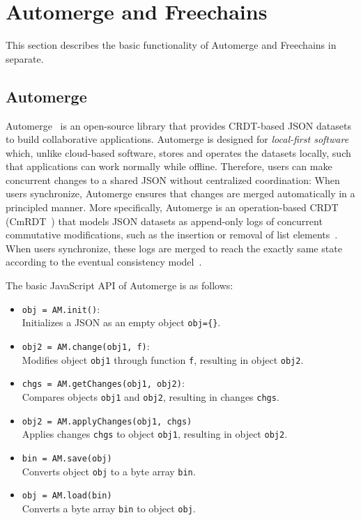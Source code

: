 \documentclass[12pt]{article}
\newcommand{\code}[1]  {\texttt{\footnotesize{#1}}}
\begin{document}
\section{Automerge and Freechains}
\label{sec.both}

This section describes the basic functionality of Automerge and Freechains in
separate.

\subsection{Automerge}

Automerge~\cite{kleppmann2018automerge} is an open-source library that provides
CRDT-based JSON datasets to build collaborative applications.
%
Automerge is designed for \emph{local-first software}~\cite{p2p.local} which,
unlike cloud-based software, stores and operates the datasets locally, such
that applications can work normally while offline.
%
Therefore, users can make concurrent changes to a shared JSON without
centralized coordination:
When users synchronize, Automerge ensures that changes are merged automatically
in a principled manner.
%
More specifically, Automerge is an operation-based CRDT
(CmRDT~\cite{p2p.crdts}) that models JSON datasets as append-only logs of
concurrent commutative modifications, such as the insertion or removal of list
elements~\cite{kleppmann2017conflict}.
%
When users synchronize, these logs are merged to reach the exactly same state
according to the eventual consistency model~\cite{p2p.sec}.

The basic JavaScript API of Automerge is as follows:

\begin{itemize}
\item \code{obj = AM.init()}: \\
    Initializes a JSON as an empty object \code{obj=\{\}}.
\item \code{obj2 = AM.change(obj1, f)}: \\
    Modifies object \code{obj1} through function \code{f}, resulting in
    object \code{obj2}.
\item \code{chgs = AM.getChanges(obj1, obj2)}: \\
    Compares objects \code{obj1} and \code{obj2}, resulting in changes
    \code{chgs}.
\item \code{obj2 = AM.applyChanges(obj1, chgs)} \\
    Applies changes \code{chgs} to object \code{obj1}, resulting in object
    \code{obj2}.
\item \code{bin = AM.save(obj)} \\
    Converts object \code{obj} to a byte array \code{bin}.
\item \code{obj = AM.load(bin)} \\
    Converts a byte array \code{bin} to object \code{obj}.
\end{itemize}
\end{document}
